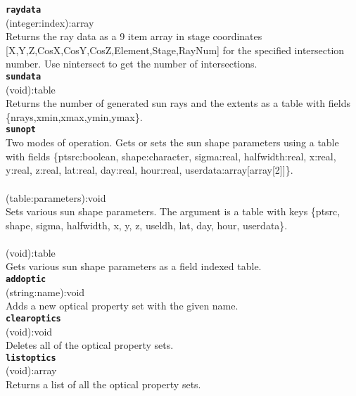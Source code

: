 \documentclass{article}
\begin{document}
{\large \texttt{\textbf{raydata}}}\\
\textsf{ (integer:index):array }\\
Returns the ray data as a 9 item array in stage coordinates [X,Y,Z,CosX,CosY,CosZ,Element,Stage,RayNum] for the specified intersection number. Use nintersect to get the number of intersections.\\

{\large \texttt{\textbf{sundata}}}\\
\textsf{ (void):table }\\
Returns the number of generated sun rays and the extents as a table with fields \{nrays,xmin,xmax,ymin,ymax\}.\\

{\large \texttt{\textbf{sunopt}}}\\
Two modes of operation.  Gets or sets the sun shape parameters using a table with fields \{ptsrc:boolean, shape:character, sigma:real, halfwidth:real, x:real, y:real, z:real, lat:real, day:real, hour:real, userdata:array[array[2]]\}.\\\\
\textsf{ (table:parameters):void }\\
Sets various sun shape parameters. The argument is a table with keys \{ptsrc, shape, sigma, halfwidth, x, y, z, useldh, lat, day, hour, userdata\}.\\
\\\textsf{ (void):table }\\
Gets various sun shape parameters as a field indexed table.\\

{\large \texttt{\textbf{addoptic}}}\\
\textsf{ (string:name):void }\\
Adds a new optical property set with the given name.\\

{\large \texttt{\textbf{clearoptics}}}\\
\textsf{ (void):void }\\
Deletes all of the optical property sets.\\

{\large \texttt{\textbf{listoptics}}}\\
\textsf{ (void):array }\\
Returns a list of all the optical property sets.\\
\end{document}
